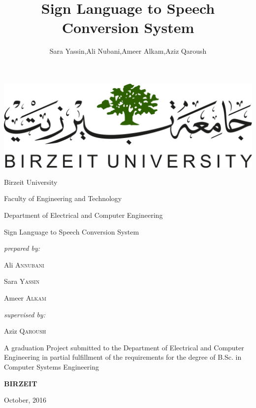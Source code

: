 \documentclass[a4paper]{report}
\title{Sign Language to Speech Conversion System}
\author{Sara Yassin,Ali Nubani,Ameer Alkam,Aziz Qaroush}
\begin{document}
\begin{titlepage}
	\centering
	{\includegraphics[]{Birzeit_University_logo.png}\par}
	\vspace{2cm}
	
	{\large Birzeit University\par}
	{\large Faculty of Engineering and Technology\par}
	{\large Department of Electrical and Computer Engineering\par}
	\vspace{1cm}
	
	{\huge Sign Language to Speech Conversion System\par}
	\vspace{1.5cm}
	
	{\small \textit{prepared by:}\par}
	{\large Ali \textsc{Annubani}\par}
	{\large Sara \textsc{Yassin}\par}
	{\large Ameer \textsc{Alkam}\par}
	\vspace{0.5cm}
	{\small \textit{supervised by:}\par}
	{\large Aziz \textsc{Qaroush}\par}
	\vspace{3cm}
	
	{A graduation Project submitted to the Department of Electrical and Computer Engineering in partial fulfillment of the requirements	for the degree of B.Sc. in Computer Systems Engineering\par}
	\vspace{2cm}
	
	{\textbf{BIRZEIT}\par}
	{October, 2016}	%
	
	\vfill
\end{titlepage}

\end{document}
